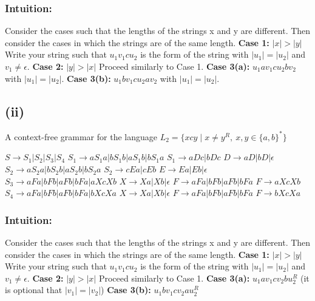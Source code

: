 \documentclass[12pt]{article}
\begin{document}
\subsubsection*{Intuition: }Consider the cases such that the lengths of the
strings x and y are different. Then consider the cases in which the strings are
of the same length.
\newline
\textbf{Case 1: }$|x| > |y|$ Write your string such that $u_1v_1cu_2$ is the
form of the string with $|u_1|=|u_2|$ and $v_1 \neq \epsilon$.
\newline
\textbf{Case 2: }$|y| > |x|$ Proceed similarly to Case 1.
\newline
\textbf{Case 3(a): }$u_1av_1cu_2bv_2$ with $|u_1|=|u_2|$.
\newline
\textbf{Case 3(b): }$u_1bv_1cu_2av_2$ with $|u_1|=|u_2|$.

\subsection*{(ii)} A context-free grammar for the language
$L_2 = \{xcy \mid x\neq y^R,\ x,y\in\{a,b\}^*\}$
\begin{center}
\parbox{7cm}{
$S \rightarrow S_1|S_2|S_3|S_4$ \newline
$S_1 \rightarrow aS_1a|bS_1b|aS_1b|bS_1a$ \newline
$S_1 \rightarrow aDc|bDc$ \newline
$D \rightarrow aD|bD| \epsilon$ \newline
$S_2 \rightarrow aS_2a|bS_2b|aS_2b|bS_2a$ \newline
$S_2 \rightarrow cEa|cEb$ \newline
$E \rightarrow Ea|Eb| \epsilon$ \newline
$S_3 \rightarrow aFa|bFb|aFb|bFa|aXcXb$ \newline
$X \rightarrow Xa|Xb|\epsilon$ \newline
$F \rightarrow aFa|bFb|aFb|bFa$ \newline
$F \rightarrow aXcXb$ \newline
$S_4 \rightarrow aFa|bFb|aFb|bFa|bXcXa$ \newline
$X \rightarrow Xa|Xb|\epsilon$ \newline
$F \rightarrow aFa|bFb|aFb|bFa$ \newline
$F \rightarrow bXcXa$
}\end{center}

\subsubsection*{Intuition: }Consider the cases such that the lengths of
the strings x and y are different. Then consider the cases in which the strings
are of the same length.
\newline
\textbf{Case 1: }$|x| > |y|$ Write your string such that $u_1v_1cu_2$ is the
form of the string with $|u_1|=|u_2|$ and $v_1 \neq \epsilon$.
\newline
\textbf{Case 2: }$|y| > |x|$ Proceed similarly to Case 1.
\newline
\textbf{Case 3(a): }$u_1av_1cv_2bu_2^R$ (it is optional that $|v_1|=|v_2|$)
\newline
\textbf{Case 3(b): }$u_1bv_1cv_2au_2^R$
\end{document}
